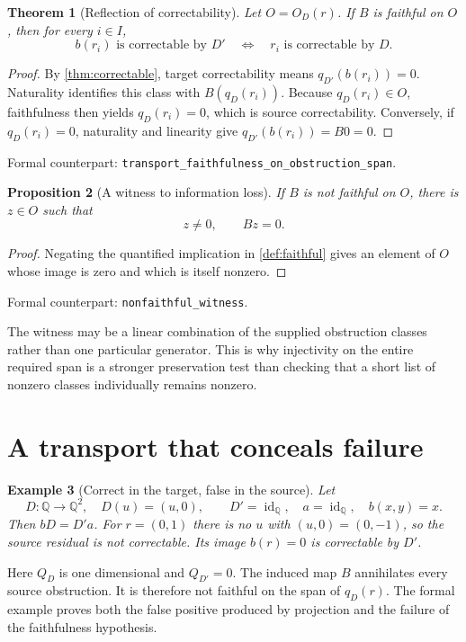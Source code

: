 \documentclass[11pt,letterpaper,oneside,openany]{book}
\theoremstyle{quiet}
\newtheorem{theorem}{Theorem}[chapter]
\newtheorem{proposition}[theorem]{Proposition}
\newtheorem{example}[theorem]{Example}
\newcommand{\Q}{\mathbb{Q}}
\DeclareMathOperator{\id}{id}
\newcommand{\formal}[1]{\par\nobreak\begingroup\footnotesize\color{Slate}\sffamily Formal counterpart: \normalfont\nolinkurl{#1}.\par\endgroup}
\begin{document}
\begin{theorem}[Reflection of correctability]\label{thm:faithful}
Let $O=O_D(r)$. If $B$ is faithful on $O$, then for every $i\in I$,
\[
b(r_i)\text{ is correctable by }D'
\quad\Longleftrightarrow\quad
r_i\text{ is correctable by }D.
\]
\end{theorem}
\begin{proof}
By \cref{thm:correctable}, target correctability means $q_{D'}(b(r_i))=0$. Naturality identifies this class with $B(q_D(r_i))$. Because $q_D(r_i)\in O$, faithfulness then yields $q_D(r_i)=0$, which is source correctability. Conversely, if $q_D(r_i)=0$, naturality and linearity give $q_{D'}(b(r_i))=B0=0$.
\end{proof}
\formal{transport_faithfulness_on_obstruction_span}

\begin{proposition}[A witness to information loss]\label{prop:loss-witness}
If $B$ is not faithful on $O$, there is $z\in O$ such that
\[
z\ne0,\qquad Bz=0.
\]
\end{proposition}
\begin{proof}
Negating the quantified implication in \cref{def:faithful} gives an element of $O$ whose image is zero and which is itself nonzero.
\end{proof}
\formal{nonfaithful_witness}

The witness may be a linear combination of the supplied obstruction classes rather than one particular generator. This is why injectivity on the entire required span is a stronger preservation test than checking that a short list of nonzero classes individually remains nonzero.

\section{A transport that conceals failure}
\begin{example}[Correct in the target, false in the source]\label{ex:loss}
Let
\[
D:\Q\to\Q^2,\quad D(u)=(u,0),\qquad
D'=\id_{\Q},\quad a=\id_{\Q},\quad b(x,y)=x.
\]
Then $bD=D'a$. For $r=(0,1)$ there is no $u$ with $(u,0)=(0,-1)$, so the source residual is not correctable. Its image $b(r)=0$ is correctable by $D'$.
\end{example}

Here $Q_D$ is one dimensional and $Q_{D'}=0$. The induced map $B$ annihilates every source obstruction. It is therefore not faithful on the span of $q_D(r)$. The formal example proves both the false positive produced by projection and the failure of the faithfulness hypothesis.
\end{document}
